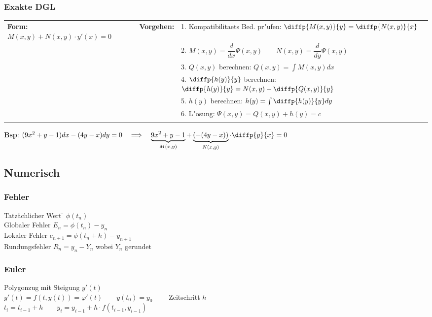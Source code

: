 \subsubsection{Exakte DGL}
\begin{tabular}{p{6cm}p{2cm}p{10.5cm}}
\textbf{Form:} $M(x,y) + N(x,y)\cdot y'(x) = 0$ &
\textbf{Vorgehen:}              &

1. Kompatibilitaets Bed. pr"ufen: $\diffp{M(x,y)}{y} = \diffp{N(x,y)}{x}$ \\ &&
2. $ M(x,y) = \dfrac{d}{dx}\Psi(x,y) \qquad N(x,y) = \dfrac{d}{dy}\Psi(x,y) $ \\ &&
3. $Q(x,y)$ berechnen: $Q(x,y) = \int M(x,y) dx$ \\ &&
4. $\diffp{h(y)}{y}$ berechnen: $\diffp{h(y)}{y} = N(x,y) - \diffp{Q(x,y)}{y}$ \\ &&
5. $h(y)$ berechnen: $h(y) = \int \diffp{h(y)}{y} dy $ \\ &&
6. L"osung: $\Psi(x,y) = Q(x,y) + h(y) = c $ \\ &&
\end{tabular}
\textbf{Bsp}: $(9x^2 + y -1)dx - (4y -x)dy = 0 \quad \Longrightarrow \quad  \underbrace{9x^2 +y -1}_{M(x,y)} + \underbrace{(-(4y -x))}_{N(x,y)} \cdot \diffp{y}{x} = 0$

\subsection{Numerisch}
\subsubsection{Fehler}

\begin{tabbing}
Tatzächlicher Wert  \= $\phi(t_n)$ \\
Globaler Fehler \> $E_n = \phi(t_n) - y_n$ \\
Lokaler Fehler \> $e_{n+1} = \phi(t_n + h) - y_{n+1}$ \\
Rundungsfehler \> $R_n = y_n - Y_n$ wobei $Y_n$ gerundet
\end{tabbing}

\subsubsection{Euler}
Polygonzug mit Steigung $y'(t)$\\
$y'(t)=f(t,y(t)) = \varphi'(t) \qquad y(t_0)=y_0 \qquad$ Zeitschritt $h$\\
$t_i = t_{i-1} + h \qquad y_i=y_{i-1} + h \cdot f(t_{i-1},y_{i-1})$\\

